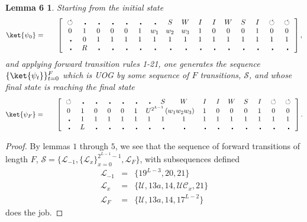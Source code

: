\documentclass[11pt,letterpaper]{article}
\newtheorem*{lem6}{Lemma 6}
\newcommand{\<}{\langle}
\renewcommand{\>}{\rangle}
\newcommand{\tur}{\,\circlearrowleft\,}   %
\newcommand{\bul}{\:\:\centerdot\:}       %
\newcommand{\iga}{\:I\,}                  %
\newcommand{\wga}{W}						%
\newcommand{\sga}{\:S\,}					%
\begin{document}
\begin{lem6}
Starting from the initial state
\begin{eqnarray}
	\ket{\psi_{0}} &=& \quad \left[ \begin{array}{cccccccccccccccc}
		\tur & \bul &
		\bul & \bul & \bul & \bul & \bul & \sga & \wga & \iga & \iga & 
		\wga & \sga & \iga & \tur & \tur
		\\		
		0 & 1    & 0    & 0    & 0    & 1    & 
		w_1 & w_2 & w_3
		 &
		1    & 0    & 0    & 0    & 1	& 0	& 0
		\\
		\bul & 0 & 1 & 1 & 1 & 1 & 1 & 1 & 1 & 1 & 1 & 1 & 1 & 1 & 1 & 1
		\\
		\bul & R & \bul & \bul & \bul & \bul & \bul & \bul & \bul & \bul & \bul & \bul & \bul & \bul & \bul & \bul
 	\end{array} \right], \label{psi03}
\end{eqnarray}
and applying forward transition rules 1-21, one generates the sequence $\{\ket{\psi_t}\}_{t=0}^F$ which is UOG by some sequence of $F$ transitions, $\mathcal{S}$, and whose final state is reaching the final state
	\begin{eqnarray}
		\ket{\psi_F} &=& \quad \left[ \begin{array}{cccccccccccccccc}
			\tur & \bul & 
			\bul & \bul & \bul & \bul & \bul & \sga & \wga & \iga & \iga & 
		\wga & \sga & \iga & \tur & \tur
			\\		
			0    & 1    & 0    & 0    & 0    & 1    & 
			\multicolumn{3}{c}{U^{2^{L-1}}\left(w_1w_2w_3\right)}  &
			1    & 0    & 0    & 0    & 1    & 0 & 0
			\\
			\bul & 1 & 1& 1& 1& 1& 1& 1& 1& 1& 1& 1& 1& 1& 1& 1
			\\
			\bul & L & \bul & \bul & \bul & \bul & \bul & \bul & \bul & \bul & \bul & \bul & \bul & \bul & \bul & \bul
	 	\end{array} \right]. \label{endstate}
	\end{eqnarray}
\end{lem6}
\begin{proof}
By lemmas $1$ through $5$, we see that the sequence of forward transitions of length $F$, $\mathcal{S}=\{\mathcal{L}_{-1},\{\mathcal{L}_x\}_{x=0}^{2^{L-1}-1},\mathcal{L}_F\}$, with subsequences defined
\begin{eqnarray}
	\mathcal{L}_{-1} &=& \{ 19^{L-3},20,21 \}
	\\
	\mathcal{L}_x&=&\{\mathcal{U},13a,14,\mathcal{UC}_x,21\}
	\\
	\mathcal{L}_F&=&\{\mathcal{U},13a,14,17^{L-2}\}
\end{eqnarray}
does the job.
\end{proof}
\end{document}
